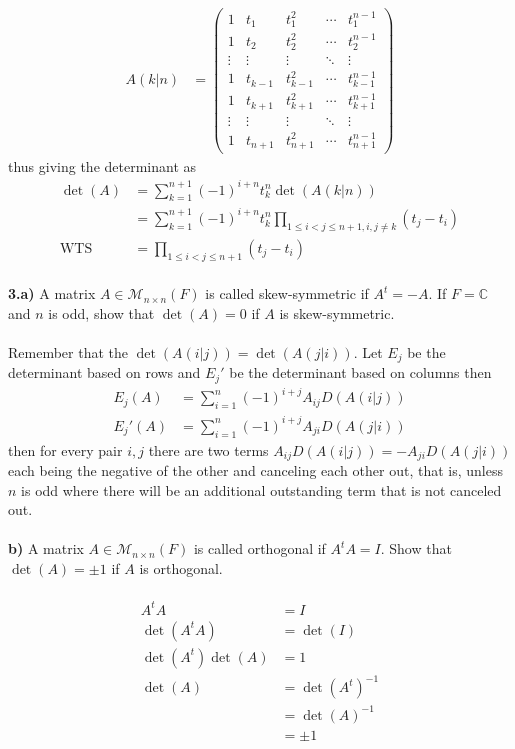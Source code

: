 \documentclass[11pt]{amsart}
\theoremstyle{definition}  %
\newcommand{\C}{\mathbb{C}}
\begin{document}
\begin{align*}
	A(k|n) &= \begin{pmatrix}
		1 & t_1 & t_1^2 & \cdots & t_1^{n-1}\\
		1 & t_2 & t_2^2 & \cdots & t_2^{n-1}\\
		\vdots & \vdots & \vdots &\ddots & \vdots \\
		1 & t_{k-1} & t_{k-1}^2 & \cdots & t_{k-1}^{n-1}\\
		1 & t_{k+1} & t_{k+1}^2 & \cdots & t_{k+1}^{n-1}\\
		\vdots & \vdots & \vdots &\ddots & \vdots \\
		1 & t_{n+1} & t_{n+1}^2 & \cdots & t_{n+1}^{n-1}
	\end{pmatrix} 
\end{align*}thus giving the determinant as 
\begin{align*}
	\det(A) &= \sum_{k=1}^{n+1} (-1)^{i+n}t_k^n \det(A(k|n)) \\
	&= \sum_{k=1}^{n+1} (-1)^{i+n}t_k^n \prod_{1 \leq i < j \leq n+1, i,j \ne k} (t_j - t_i) \\
	\text{WTS } &= \prod_{1\le i<j \le n+1}(t_j-t_i)
\end{align*}
\\
\vskip 0.1cm
\noindent
{\bf 3.a)}  A matrix $A \in \mathcal{M}_{n \times n}(F)$ is called
skew-symmetric if $A^t = -A$. If $F = \C$ and $n$ is odd, show that
$\det(A) = 0$ if $A$ is skew-symmetric. \\
\\
Remember that the $\det(A(i|j)) = \det(A(j|i))$.  Let $E_j$ be the determinant based on rows and $E_j'$ be the determinant based on columns then
\begin{align*}
	E_j(A) &= \sum_{i=1}^n (-1)^{i+j}A_{ij} D(A(i|j))\\
	E_j'(A) &= \sum_{i=1}^n (-1)^{i+j}A_{ji} D(A(j|i))
\end{align*}then for every pair $i,j$ there are two terms  $A_{ij}D(A(i|j))= -A_{ji}D(A(j|i))$ each being the negative of the other and canceling each other out, that is, unless $n$ is odd where there will be an additional outstanding term that is not canceled out.  \\
\\
{\bf b)}  A matrix $A \in \mathcal{M}_{n \times n}(F)$ is called orthogonal if $A^tA = I$. Show that $\det(A) = \pm 1$ if $A$ is orthogonal. \\
\\
\begin{align*}
	A^tA &= I \\
	\det(A^tA) &= \det(I)\\
	\det(A^t)\det(A) &= 1 \\
	\det(A) &= \det(A^t)^{-1} \\
	&= \det(A)^{-1} \\
	&= \pm 1
\end{align*}
\end{document}
